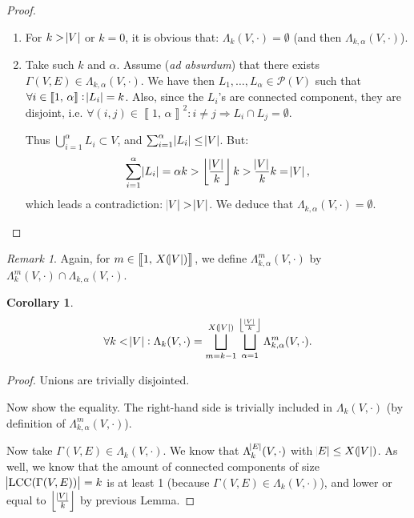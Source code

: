 \documentclass{article}
\newtheorem{corollary}[lemma]{Corollary}
\theoremstyle{definition}
\theoremstyle{remark}
\newtheorem*{remark}{Remark}
\DeclareMathOperator{\LCC}{LCC}
\newcommand{\intint}[2]{\left\llbracket#1, \, #2\right\rrbracket}
\newcommand{\floor}[1]{\left\lfloor#1\right\rfloor}
\begin{document}
		\begin{proof}~
		\begin{enumerate}
			\item For $k > \abs V$ or $k=0$, it is obvious that: $\Lambda_k(V, \cdot) = \emptyset$ (and then $\Lambda_{k,\alpha}(V, \cdot)$).
			\item Take such $k$ and $\alpha$. Assume (\textit{ad absurdum}) that there exists $\Gamma(V, E) \in \Lambda_{k, \alpha}(V, \cdot)$. We have then
			$L_1, \ldots, L_\alpha \in \mathcal P(V)$ such that $\forall i \in \intint 1\alpha : \abs {L_i} = k$. Also, since the $L_i$'s are connected component,
			they are disjoint, i.e. $\forall (i, j) \in \intint 1\alpha^2 : i \neq j \Rightarrow L_i \cap L_j = \emptyset$.

			Thus $\bigcup_{i=1}^\alpha L_i \subset V$, and $\sum_{i=1}^\alpha \abs {L_i} \leq \abs V$. But:
			\[\sum_{i=1}^\alpha\abs {L_i} = \alpha k > \floor {\frac {\abs V}k}k > \frac {\abs V}kk = \abs V,\]
			which leads a contradiction: $\abs V > \abs V$.
			We deduce that $\Lambda_{k,\alpha}(V, \cdot) = \emptyset$.
		\end{enumerate}
		\end{proof}

		\begin{remark} Again, for $m \in \intint 1{X(\abs V)}$, we define $\Lambda_{k,\alpha}^m(V, \cdot)$ by $\Lambda_k^m(V, \cdot) \cap \Lambda_{k,\alpha}(V, \cdot)$.
		\end{remark}

		\begin{corollary}
		\[\forall k < \abs V : \Lambda_k(V, \cdot) = \bigsqcup_{m=k-1}^{X(\abs V)}\bigsqcup_{\alpha=1}^{\floor {\frac {\abs V}k}}\Lambda_{k,\alpha}^m(V, \cdot).\]
		\end{corollary}

		\begin{proof} Unions are trivially disjointed.

		Now show the equality. The right-hand side is trivially included in $\Lambda_k(V, \cdot)$ (by definition of $\Lambda_{k,\alpha}^m(V, \cdot)$).

		Now take $\Gamma(V, E) \in \Lambda_k(V, \cdot)$. We know that $\Lambda_k^{\abs E}(V, \cdot)$ with $\abs E \leq X(\abs V)$. As well, we know that the amount
		of connected components of size $\abs {\LCC(\Gamma(V, E))} = k$ is at least 1 (because $\Gamma(V, E) \in \Lambda_k(V, \cdot)$), and lower or equal to
		$\floor {\frac {\abs V}k}$ by previous Lemma.
		\end{proof}
\end{document}
